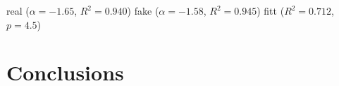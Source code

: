 real ($\alpha = -1.65$, $R^2 = 0.940$)
fake ($\alpha = -1.58$, $R^2 = 0.945$)
fitt ($R^2 = 0.712$, $p = 4.5$)

\section{Conclusions}

%
%
%
%
%
%
%
%
%
%
%
